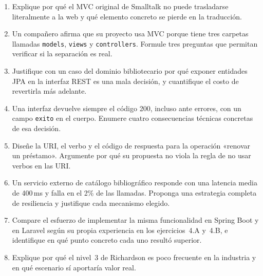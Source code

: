 \documentclass[11pt,a4paper,openany]{book}
\begin{document}
\begin{enumerate}
	\item Explique por qué el MVC original de Smalltalk no puede trasladarse literalmente a la web y qué elemento concreto se pierde en la traducción.
	\item Un compañero afirma que su proyecto usa MVC porque tiene tres carpetas llamadas \texttt{models}, \texttt{views} y \texttt{controllers}. Formule tres preguntas que permitan verificar si la separación es real.
	\item Justifique con un caso del dominio bibliotecario por qué exponer entidades JPA en la interfaz REST es una mala decisión, y cuantifique el costo de revertirla más adelante.
	\item Una interfaz devuelve siempre el código 200, incluso ante errores, con un campo \texttt{exito} en el cuerpo. Enumere cuatro consecuencias técnicas concretas de esa decisión.
	\item Diseñe la URI, el verbo y el código de respuesta para la operación «renovar un préstamo». Argumente por qué su propuesta no viola la regla de no usar verbos en las URI.
	\item Un servicio externo de catálogo bibliográfico responde con una latencia media de 400\,ms y falla en el 2\% de las llamadas. Proponga una estrategia completa de resiliencia y justifique cada mecanismo elegido.
	\item Compare el esfuerzo de implementar la misma funcionalidad en Spring Boot y en Laravel según su propia experiencia en los ejercicios~4.A y~4.B, e identifique en qué punto concreto cada uno resultó superior.
	\item Explique por qué el nivel~3 de Richardson es poco frecuente en la industria y en qué escenario sí aportaría valor real.
\end{enumerate}



\end{document}
